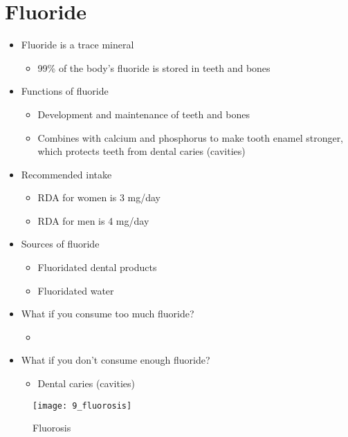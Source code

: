 \documentclass[title={Chapter 9}]{fdsn201notes}
\begin{document}
\section{Fluoride}\label{sec:Fluoride}
\begin{itemize}
	\item Fluoride is a trace mineral
	\begin{itemize}
		\item 99\% of the body’s fluoride is stored in teeth and bones
	\end{itemize}
	\item Functions of fluoride
	\begin{itemize}
		\item Development and maintenance of teeth and bones
		\item Combines with calcium and phosphorus to make tooth enamel stronger, which protects teeth from dental caries (cavities)
	\end{itemize}
	\item Recommended intake
	\begin{itemize}
		\item RDA for women is 3 mg/day
		\item RDA for men is 4 mg/day
	\end{itemize}
	\item Sources of fluoride
	\begin{itemize}
		\item Fluoridated dental products
		\item Fluoridated water
	\end{itemize}
	\item What if you consume too much fluoride?
	\begin{itemize}
		\item {}
	\end{itemize}
	\item What if you don’t consume enough fluoride?
	\begin{itemize}
		\item Dental caries (cavities)
	\end{itemize}
\end{itemize}

\begin{figure}[H]
	\centering
	\texttt{[image: 9\_fluorosis]}
	\caption{Fluorosis}
	\label{fig:fluorosis}
\end{figure}
\end{document}
